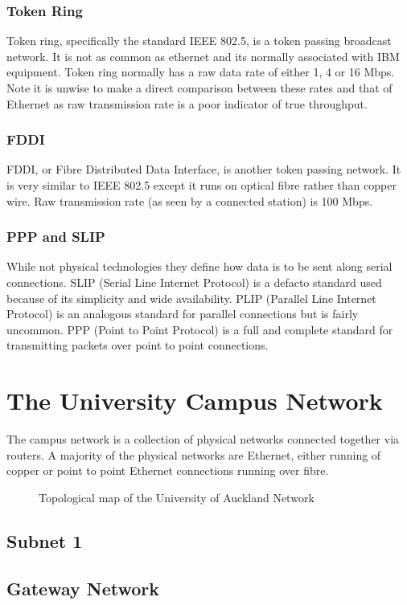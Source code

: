 \subsubsection{Token Ring}

Token ring, specifically the standard IEEE 802.5, is a token passing
broadcast network.  It is not as common as ethernet and its normally
associated with IBM equipment.  Token ring normally has a raw data
rate of either 1, 4 or 16 Mbps.  Note it is unwise to make a direct
comparison between these rates and that of Ethernet as raw
transmission rate is a poor indicator of true throughput.

\subsubsection{FDDI}

FDDI, or Fibre Distributed Data Interface, is another token passing
network.  It is very similar to IEEE 802.5 except it runs on optical
fibre rather than copper wire.  Raw transmission rate (as seen by a
connected station) is 100 Mbps.

\subsubsection{PPP and SLIP}

While not physical technologies they define how data is to be sent
along serial connections.  SLIP (Serial Line Internet Protocol) is a
defacto standard used because of its simplicity and wide
availability.  PLIP (Parallel Line Internet Protocol) is an analogous
standard for parallel connections but is fairly uncommon.  PPP (Point
to Point Protocol) is a full and complete standard for transmitting
packets over point to point connections.

\section{The University Campus Network}

The campus network is a collection of physical networks connected
together via routers.  A majority of the physical networks are
Ethernet, either running of copper or point to point Ethernet
connections running over fibre.

\begin{figure}
\leavevmode
{}
\caption{Topological map of the University of Auckland Network}
\label{map:uni}
\end{figure}

\subsection{Subnet 1}

\subsection{Gateway Network}
